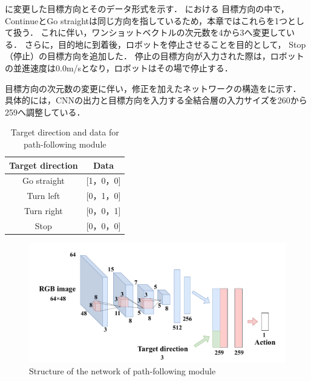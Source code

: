 に変更した目標方向とそのデータ形式を示す．
における
目標方向の中で，ContinueとGo straightは同じ方向を指しているため，本章ではこれらを1つとして扱う．
これに伴い，ワンショットベクトルの次元数を4から3へ変更している．
さらに，目的地に到着後，ロボットを停止させることを目的として，
Stop（停止）の目標方向を追加した．
停止の目標方向が入力された際は，ロボットの並進速度は0.0m/sとなり，ロボットはその場で停止する．

目標方向の次元数の変更に伴い，修正を加えたネットワークの構造をに示す．
具体的には，CNNの出力と目標方向を入力する全結合層の入力サイズを260から259へ調整している．

\begin{table}[htbp]
    \centering
    \caption{Target direction and data for path-following module}\label{tab:target}
    \begin{tabular}{|c|c|}
    \hline
    Target direction & Data        \\
    \hline
    Go straight   & {[}1，0，0{]} \\
    Turn left   & {[}0，1，0{]} \\
    Turn right   & {[}0，0，1{]} \\
    Stop   & {[}0，0，0{]}\\
    \hline
    \end{tabular}
    \end{table}
\begin{figure}[htbp]
    \centering
     \includegraphics[width=130mm]{images/pdf/imi_net.pdf}
     \caption{Structure of the network of path-following module}
     \label{fig:imi_net}
\end{figure}

